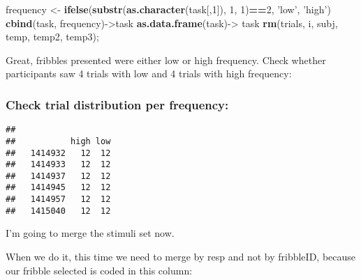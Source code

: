 \documentclass[
]{article}
\newenvironment{Shaded}{\begin{snugshade}}{\end{snugshade}}
\newcommand{\DecValTok}[1]{\textcolor[rgb]{0.00,0.00,0.81}{#1}}
\newcommand{\KeywordTok}[1]{\textcolor[rgb]{0.13,0.29,0.53}{\textbf{#1}}}
\newcommand{\NormalTok}[1]{#1}
\newcommand{\OperatorTok}[1]{\textcolor[rgb]{0.81,0.36,0.00}{\textbf{#1}}}
\newcommand{\StringTok}[1]{\textcolor[rgb]{0.31,0.60,0.02}{#1}}
\begin{document}
\begin{Shaded}
\begin{Highlighting}[]
\NormalTok{frequency <-}\StringTok{ }\KeywordTok{ifelse}\NormalTok{(}\KeywordTok{substr}\NormalTok{(}\KeywordTok{as.character}\NormalTok{(task[,}\DecValTok{1}\NormalTok{]), }\DecValTok{1}\NormalTok{, }\DecValTok{1}\NormalTok{)}\OperatorTok{==}\DecValTok{2}\NormalTok{, }\StringTok{'low'}\NormalTok{, }\StringTok{'high'}\NormalTok{)}
\KeywordTok{cbind}\NormalTok{(task, frequency)->task}
\KeywordTok{as.data.frame}\NormalTok{(task)->}\StringTok{ }\NormalTok{task}
\KeywordTok{rm}\NormalTok{(trials, i, subj, temp, temp2, temp3);}
\end{Highlighting}
\end{Shaded}

Great, fribbles presented were either low or high frequency. Check
whether participants saw 4 trials with low and 4 trials with high
frequency:

\hypertarget{check-trial-distribution-per-frequency}{%
\subsubsection{Check trial distribution per
frequency:}\label{check-trial-distribution-per-frequency}}

\begin{Shaded}
\end{Shaded}

\begin{verbatim}
##          
##           high low
##   1414932   12  12
##   1414933   12  12
##   1414937   12  12
##   1414945   12  12
##   1414957   12  12
##   1415040   12  12
\end{verbatim}

I'm going to merge the stimuli set now.

When we do it, this time we need to merge by resp and not by fribbleID,
because our fribble selected is coded in this column:
\end{document}
